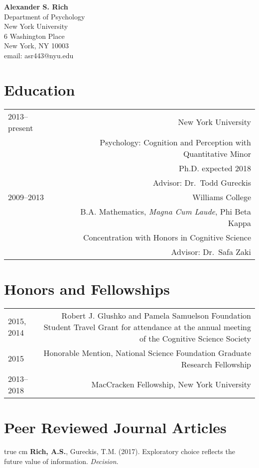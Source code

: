 \documentclass[12pt]{my_cv}
\def\ind{\hangindent=1 true cm\hangafter=1 \noindent}
\begin{document}
\noindent \textbf{\sffamily\Large Alexander S. Rich}\vspace{1em}\\
Department of Psychology\\
New York University\\
6 Washington Place\\
 New York, NY 10003\\
email: asr443@nyu.edu\\

\section{Education}
\begin{tabular}{L R}
2013--present&New York University\\
&Psychology: Cognition and Perception with Quantitative Minor\\
&Ph.D. expected 2018\\
&Advisor: Dr.\ Todd Gureckis \vspace{1em}\\ 
2009--2013&Williams College\\
&B.A. Mathematics, \emph{Magna Cum Laude}, Phi Beta Kappa\\
&Concentration with Honors in Cognitive Science\\
&Advisor: Dr.\ Safa Zaki\\
\end{tabular}

\section{Honors and Fellowships}
\begin{tabular}{L R}
2015, 2014&Robert J. Glushko and Pamela Samuelson Foundation Student Travel Grant for attendance at the annual meeting of the Cognitive Science Society\\[1ex]
2015&Honorable Mention, National Science Foundation Graduate Research Fellowship\\[1ex]
2013--2018&MacCracken Fellowship, New York University\\
\end{tabular}

\section{Peer Reviewed Journal Articles}

\ind \textbf{Rich, A.S.}, Gureckis, T.M. (2017). Exploratory choice
reflects the future value of information. \emph{Decision}.
\end{document}

